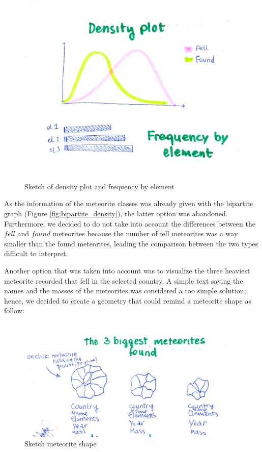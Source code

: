 \documentclass[10pt,conference,compsocconf]{IEEEtran}
\begin{document}
\begin{figure}[]
  \centering
  \includegraphics[width=\columnwidth]{images/densityplot}
  \vspace{-3mm}
  \caption{Sketch of density plot and frequency by element}
  \label{fig:density_plot}
\end{figure}


As the information of the meteorite classes was already given with the bipartite graph (Figure \ref{fig:bipartite_density}), the latter option was abandoned. Furthermore, we decided to do not take into account the differences between the $fell$ and $found$ meteorites because the number of fell meteorites was a way smaller than the found meteorites, leading the comparison between the two types difficult to interpret.   

Another option that was taken into account was to visualize the three heaviest meteorite recorded that fell in the selected country. A simple text saying the names and the masses of the meteorites was considered a too simple solution; hence, we decided to create a geometry that could remind a meteorite shape as follow:

\begin{figure}[]
  \centering
  \includegraphics[width=\columnwidth]{images/3biggestmeteorites}
  \caption{Sketch meteorite shape}
  \label{fig:sketch_3_biggest}
\end{figure}
\end{document}
